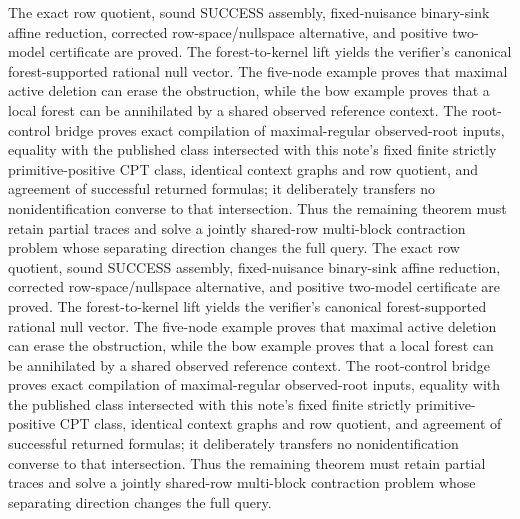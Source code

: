 The exact row quotient, sound SUCCESS assembly, fixed-nuisance binary-sink affine reduction, corrected row-space/nullspace alternative, and positive two-model certificate are proved. The forest-to-kernel lift yields the verifier's canonical forest-supported rational null vector. The five-node example proves that maximal active deletion can erase the obstruction, while the bow example proves that a local forest can be annihilated by a shared observed reference context. The root-control bridge proves exact compilation of maximal-regular observed-root inputs, equality with the published class intersected with this note's fixed finite strictly primitive-positive CPT class, identical context graphs and row quotient, and agreement of successful returned formulas; it deliberately transfers no nonidentification converse to that intersection. Thus the remaining theorem must retain partial traces and solve a jointly shared-row multi-block contraction problem whose separating direction changes the full query.
The exact row quotient, sound SUCCESS assembly, fixed-nuisance binary-sink affine reduction, corrected row-space/nullspace alternative, and positive two-model certificate are proved. The forest-to-kernel lift yields the verifier's canonical forest-supported rational null vector. The five-node example proves that maximal active deletion can erase the obstruction, while the bow example proves that a local forest can be annihilated by a shared observed reference context. The root-control bridge proves exact compilation of maximal-regular observed-root inputs, equality with the published class intersected with this note's fixed finite strictly primitive-positive CPT class, identical context graphs and row quotient, and agreement of successful returned formulas; it deliberately transfers no nonidentification converse to that intersection. Thus the remaining theorem must retain partial traces and solve a jointly shared-row multi-block contraction problem whose separating direction changes the full query.
